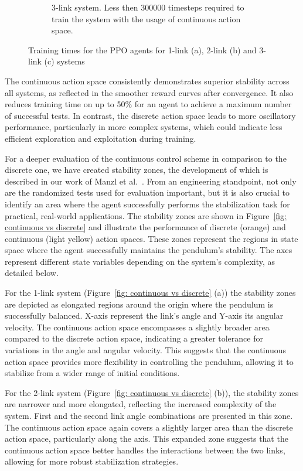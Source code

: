 \begin{figure}[h!]
\begin{subfigure}[t]{0.48\textwidth}
		\label{fig: tp - training time}
		\caption{3-link system. Less then 300000 timesteps required to train the system with the usage of continuous action space.}
	\end{subfigure}
	
	\caption{Training times for the PPO agents for 1-link (a), 2-link (b) and 3-link (c) systems}
	\label{fig: training time comparison}
\end{figure}

The continuous action space consistently demonstrates superior stability across all systems, as reflected in the smoother reward curves after convergence. It also reduces training time on up to 50\% for an agent to achieve a maximum number of successful tests. In contrast, the discrete action space leads to more oscillatory performance, particularly in more complex systems, which could indicate less efficient exploration and exploitation during training.

For a deeper evaluation of the continuous control scheme in comparison to the discrete one, we have created stability zones, the development of which is described in our work of Manzl et al.~\cite{manzl2023relrl}. From an engineering standpoint, not only are the randomized tests used for evaluation important, but it is also crucial to identify an area where the agent successfully performs the stabilization task for practical, real-world applications. The stability zones are shown in Figure~\ref{fig: continuous vs discrete} and illustrate the performance of discrete (orange) and continuous (light yellow) action spaces. These zones represent the regions in state space where the agent successfully maintains the pendulum's stability. The axes represent different state variables depending on the system's complexity, as detailed below.

For the 1-link system (Figure~\ref{fig: continuous vs discrete} (a)) the stability zones are depicted as elongated regions around the origin where the pendulum is successfully balanced. X-axis represent the link's angle and Y-axis its angular velocity. The continuous action space encompasses a slightly broader area compared to the discrete action space, indicating a greater tolerance for variations in the angle and angular velocity. This suggests that the continuous action space provides more flexibility in controlling the pendulum, allowing it to stabilize from a wider range of initial conditions. 

For the 2-link system (Figure~\ref{fig: continuous vs discrete} (b)), the stability zones are narrower and more elongated, reflecting the increased complexity of the system. First and the second link angle combinations are presented in this zone. The continuous action space again covers a slightly larger area than the discrete action space, particularly along the axis. This expanded zone suggests that the continuous action space better handles the interactions between the two links, allowing for more robust stabilization strategies. 

